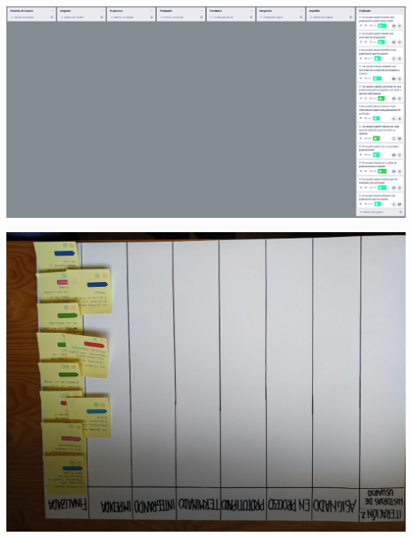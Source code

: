 \documentclass[spanish]{beamer}
\begin{document}
\begin{frame}
	\begin{center}
		\includegraphics[scale=0.27]{trello2_9}
	\end{center}
\end{frame}

\begin{frame}
	\begin{center}
		\includegraphics[angle=180, scale=0.33]{papel2_9}
	\end{center}
\end{frame}
\end{document}
